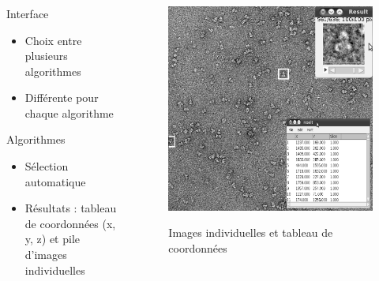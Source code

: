 \documentclass[11pt]{beamer}
\begin{document}
\begin{frame}
\frametitle{\subsecname}
	\begin{columns}[t]
		
		\begin{column}{5cm}
			\begin{block}{Interface}
				\begin{itemize}
					\item Choix entre plusieurs algorithmes
					\item Différente pour chaque algorithme
				\end{itemize}
			\end{block}
			\begin{block}{Algorithmes}
				\begin{itemize}
					\item Sélection automatique
					\item Résultats : tableau de coordonnées (x, y, z) et pile d'images individuelles
				\end{itemize}
			\end{block}
		\end{column}
		\begin{column}{5cm}
			\begin{figure}
				\includegraphics[scale=0.07]{CropResultPickB.png}
				
				Images individuelles et tableau de coordonnées
			\end{figure}
		\end{column}
	\end{columns}	
\end{frame}
\end{document}
